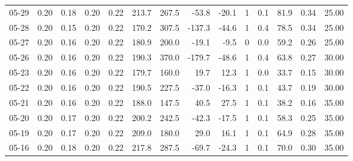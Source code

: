 \begin{threeparttable}
{\begin{tabular}{lrrrrrrrrrrrrr}
  05-29 &          0.20 &          0.18 &          0.20 &        0.22 &               213.7 &               267.5 &      -53.8 &        -20.1 &              1 &                 0.1 &             81.9 &            0.34 &                  25.00 \\
  05-28 &          0.20 &          0.15 &          0.20 &        0.22 &               170.2 &               307.5 &     -137.3 &        -44.6 &              1 &                 0.4 &             78.5 &            0.34 &                  25.00 \\
  05-27 &          0.20 &          0.16 &          0.20 &        0.22 &               180.9 &               200.0 &      -19.1 &         -9.5 &              0 &                 0.0 &             59.2 &            0.26 &                  25.00 \\
  05-26 &          0.20 &          0.16 &          0.20 &        0.22 &               190.3 &               370.0 &     -179.7 &        -48.6 &              1 &                 0.4 &             63.8 &            0.27 &                  30.00 \\
  05-23 &          0.20 &          0.16 &          0.20 &        0.22 &               179.7 &               160.0 &       19.7 &         12.3 &              1 &                 0.0 &             33.7 &            0.15 &                  30.00 \\
  05-22 &          0.20 &          0.16 &          0.20 &        0.22 &               190.5 &               227.5 &      -37.0 &        -16.3 &              1 &                 0.1 &             43.7 &            0.19 &                  30.00 \\
  05-21 &          0.20 &          0.16 &          0.20 &        0.22 &               188.0 &               147.5 &       40.5 &         27.5 &              1 &                 0.1 &             38.2 &            0.16 &                  35.00 \\
  05-20 &          0.20 &          0.17 &          0.20 &        0.22 &               200.2 &               242.5 &      -42.3 &        -17.5 &              1 &                 0.1 &             58.3 &            0.25 &                  35.00 \\
  05-19 &          0.20 &          0.17 &          0.20 &        0.22 &               209.0 &               180.0 &       29.0 &         16.1 &              1 &                 0.1 &             64.9 &            0.28 &                  35.00 \\
  05-16 &          0.20 &          0.18 &          0.20 &        0.22 &               217.8 &               287.5 &      -69.7 &        -24.3 &              1 &                 0.1 &             70.0 &            0.30 &                  35.00 \\

\end{tabular}}
\end{threeparttable}
